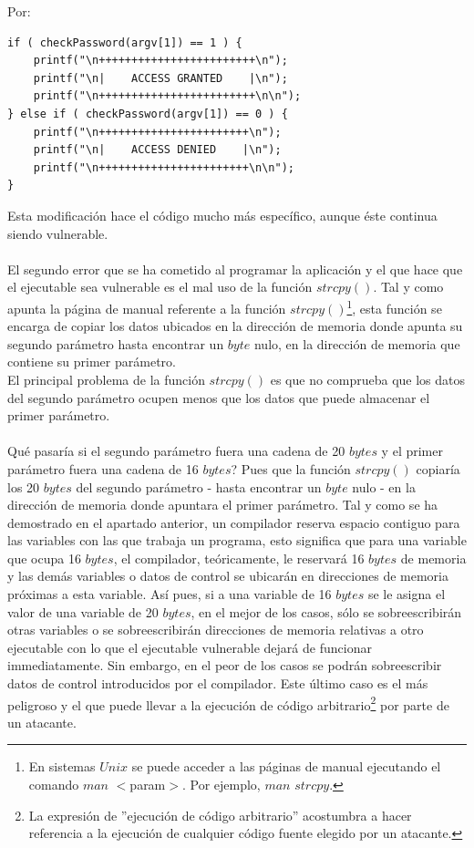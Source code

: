 \documentclass [titlepage, 12pt]{article}
\begin{document}
Por:

\lstset{language=C++,caption=C\'odigo espec\'ifico,label=fig:codigoEspecifico}
\begin{lstlisting}
if ( checkPassword(argv[1]) == 1 ) {
	printf("\n++++++++++++++++++++++++\n");
	printf("\n|    ACCESS GRANTED    |\n");
	printf("\n++++++++++++++++++++++++\n\n");
} else if ( checkPassword(argv[1]) == 0 ) {
	printf("\n+++++++++++++++++++++++\n");
	printf("\n|    ACCESS DENIED    |\n");
	printf("\n+++++++++++++++++++++++\n\n");
}
\end{lstlisting}    

Esta modificaci\'on hace el c\'odigo mucho m\'as espec\'ifico, aunque \'este continua siendo vulnerable.\\
\\ 
El segundo error que se ha cometido al programar la aplicaci\'on y el que hace que el ejecutable sea vulnerable es el mal uso de la funci\'on $strcpy()$. Tal y como apunta la p\'agina de manual referente a la funci\'on $strcpy()$\footnote{En sistemas $Unix$ se puede acceder a las p\'aginas de manual ejecutando el comando $man$ $<$param$>$. Por ejemplo, $man$ $strcpy$.}, esta funci\'on se encarga de copiar los datos ubicados en la direcci\'on de memoria donde apunta su segundo par\'ametro hasta encontrar un $byte$ nulo, en la direcci\'on de memoria que contiene su primer par\'ametro.\\
El principal problema de la funci\'on $strcpy()$ es que no comprueba que los datos del segundo par\'ametro ocupen menos que los datos que puede almacenar el primer par\'ametro.\\
\\
Qu\'e pasar\'ia si el segundo par\'ametro fuera una cadena de 20 $bytes$ y el primer par\'ametro fuera una cadena de 16 $bytes$? Pues que la funci\'on $strcpy()$ copiar\'ia los 20 $bytes$ del segundo par\'ametro - hasta encontrar un $byte$ nulo - en la direcci\'on de memoria donde apuntara el primer par\'ametro. Tal y como se ha demostrado en el apartado anterior, un compilador reserva espacio contiguo para las variables con las que trabaja un programa, esto significa que para una variable que ocupa 16 $bytes$, el compilador, te\'oricamente, le reservar\'a 16 $bytes$ de memoria y las dem\'as variables o datos de control se ubicar\'an en direcciones de memoria pr\'oximas a esta variable. As\'i pues, si a una variable de 16 $bytes$ se le asigna el valor de una variable de 20 $bytes$, en el mejor de los casos, s\'olo se sobreescribir\'an otras variables o se sobreescribir\'an direcciones de memoria relativas a otro ejecutable con lo que el ejecutable vulnerable dejar\'a de funcionar immediatamente. Sin embargo, en el peor de los casos se podr\'an sobreescribir datos de control introducidos por el compilador. Este \'ultimo caso es el m\'as peligroso y el que puede llevar a la ejecuci\'on de c\'odigo arbitrario\footnote{La expresi\'on de ''ejecuci\'on de c\'odigo arbitrario'' acostumbra a hacer referencia a la ejecuci\'on de cualquier c\'odigo fuente elegido por un atacante.} por parte de un atacante. \\
\end{document}
